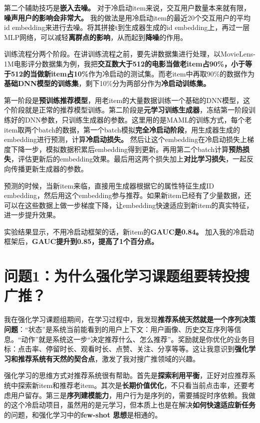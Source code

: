 \documentclass[UTF8]{ctexart}
\begin{document}
第二个辅助技巧是\textbf{嵌入去噪。} 对于冷启动item来说，交互用户数量本来就有限，\textbf{噪声用户的影响会非常大。} 我的做法是用冷启动item的最近20个交互用户的平均id embedding来进行去噪。将其拼接t到生成器生成的id embedding上，再过一层MLP网络，可以减轻\textbf{离群点的影响}，从而起到\textbf{降噪}的作用。


训练流程分两个阶段。在讲训练流程之前，要先讲数据集进行处理，以MovieLens-1M电影评分数据集为例，我把\textbf{交互数大于512的电影当做老item占90\%，小于等于512的当做新item占10\%}作为冷启动的测试集。而老item中再取90\%的数据作为\textbf{基础DNN模型的训练集}，剩下10\%分为两部分作为\textbf{冷启动训练集。}

第一阶段是\textbf{预训练推荐模型}，用老item的大量数据训练一个基础的DNN模型，这个阶段就是正常的推荐模型训练。第二阶段是\textbf{元学习训练生成器}，冻结第一阶段训练好的DNN参数，只训练生成器的参数。这里用的是MAML的训练方式，每个老item取两个batch的数据，第一个batch模拟\textbf{完全冷启动阶段}，用生成器生成的embedding进行预测，计算\textbf{冷启动损失。} 然后让这个embedding在冷启动损失上梯度下降一步，模拟数据积累后embedding得到更新。再用第二个batch计算\textbf{预热损失}，评估更新后的embedding效果。最后用这两个损失加上\textbf{对比学习损失}，一起反向传播更新生成器的参数。

预测的时候，当新item来临，直接用生成器根据它的属性特征生成ID embedding，然后用这个embedding参与推荐。如果新item已经有了少量数据，还可以在这些数据上做一步梯度下降，让embedding快速适应到新item的真实特征，进一步提升效果。

实验结果显示，不用冷启动框架的话，新item的\textbf{GAUC是0.84。} 加入我的冷启动框架后，\textbf{GAUC提升到0.85，提高了1个百分点。}

\section{问题1：为什么强化学习课题组要转投搜广推？}

我在强化学习课题组期间，在学习过程中，我发现\textbf{推荐系统天然就是一个序列决策问题}：“状态”是系统当前能看到的用户上下文：用户画像、历史交互序列等信息。“动作”就是系统这一步“决定推荐什么、怎么推荐”。奖励就是你优化的业务目标：点击率、停留时长、观看时长、点赞、关注、分享等等。这让我意识到\textbf{强化学习和推荐系统有天然的契合点}，激发了我对搜广推领域的兴趣。

强化学习的思维方式对推荐系统很有帮助。首先是\textbf{探索利用平衡}，正好对应推荐系统中探索新item和推荐老item。其次是\textbf{长期价值优化}，不只看当前点击率，还要考虑用户留存。第三是\textbf{序列建模能力}，用户行为是序列的，需要捕捉时序依赖。我做的这个冷启动项目，虽然用的是元学习，但本质上也是在解决\textbf{如何快速适应新任务}的问题，和强化学习中的\textbf{few-shot 思想}是相通的。
\end{document}
